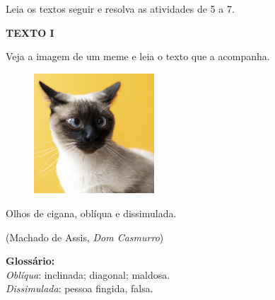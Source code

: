 Leia os textos seguir e resolva as atividades de 5 a 7.

\begin{myquote}
\begin{center}
\textbf{TEXTO I}
\end{center}

\noindent Veja a imagem de um meme e leia o texto que a acompanha.

\begin{figure}[H]
\centering\includegraphics[width=0.4\textwidth]{./imgSAEB_6_POR/freepik/PORT_6_IMG-16.jpeg}
\end{figure}

Olhos de cigana, oblíqua e dissimulada.

\medskip

\begin{flushright}
(Machado de Assis, \emph{Dom Casmurro})
\end{flushright}

\noindent\textbf{Glossário:}\\
\textit{Oblíqua}: inclinada; diagonal; maldosa.\\
\textit{Dissimulada}: pessoa fingida, falsa.
\end{myquote}

